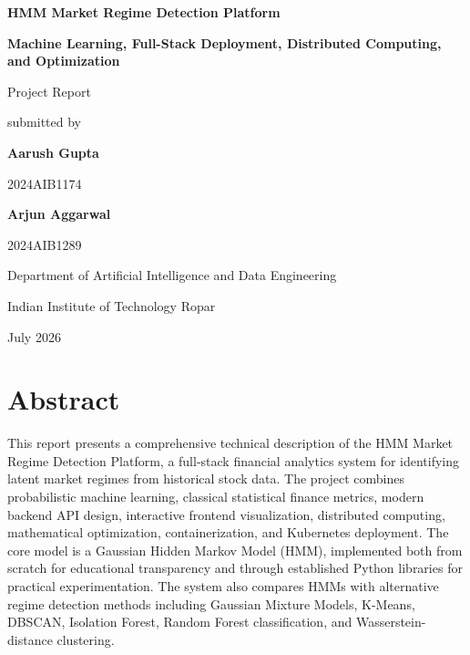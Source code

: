 \documentclass[12pt,a4paper]{report}
\begin{document}
\begin{titlepage}
    \centering
    \vspace*{1.0cm}
    {\Large\bfseries HMM Market Regime Detection Platform\par}
    \vspace{0.4cm}
    {\large\bfseries Machine Learning, Full-Stack Deployment, Distributed Computing, and Optimization\par}
    \vspace{1.0cm}
    {\large Project Report\par}
    \vspace{0.8cm}
    {\large submitted by\par}
    \vspace{0.4cm}
    {\large\bfseries Aarush Gupta\par}
    {\large 2024AIB1174\par}
    \vspace{0.3cm}
    {\large\bfseries Arjun Aggarwal\par}
    {\large 2024AIB1289\par}
    \vfill
    {\large Department of Artificial Intelligence and Data Engineering\par}
    {\large Indian Institute of Technology Ropar\par}
    \vspace{0.7cm}
    {\large July 2026\par}
\end{titlepage}


\chapter*{Abstract}
This report presents a comprehensive technical description of the HMM Market Regime Detection Platform, a full-stack financial analytics system for identifying latent market regimes from historical stock data. The project combines probabilistic machine learning, classical statistical finance metrics, modern backend API design, interactive frontend visualization, distributed computing, mathematical optimization, containerization, and Kubernetes deployment. The core model is a Gaussian Hidden Markov Model (HMM), implemented both from scratch for educational transparency and through established Python libraries for practical experimentation. The system also compares HMMs with alternative regime detection methods including Gaussian Mixture Models, K-Means, DBSCAN, Isolation Forest, Random Forest classification, and Wasserstein-distance clustering. 
\end{document}
